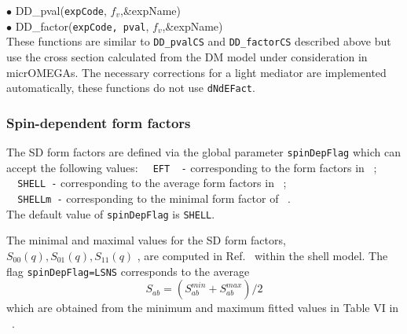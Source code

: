 \documentclass[12pt,a4paper]{article}
\begin{document}
\noindent
$\bullet$ DD\_pval(\verb|expCode|, $f_v$,\&expName)\\
$\bullet$  DD\_factor(\verb|expCode, pval|, $f_v$,\&expName)\\     
These functions are similar to  \verb|DD_pvalCS| and \verb|DD_factorCS| described above but use the  cross section calculated from the DM model under consideration in 
micrOMEGAs.  The necessary corrections for a light mediator are implemented automatically, these functions do not use {\tt dNdEFact}. \\

\subsubsection{Spin-dependent form factors}  
\label{SDmin}

The SD form factors are defined via the global parameter 
{\tt spinDepFlag}  which can accept the following values:
  \verb|  EFT  -|  corresponding to  the form factors in ~\cite{Fitzpatrick:2012ix}; \\
  \verb|  SHELL -|  corresponding to  the average form factors in ~\cite{Klos:2013rwa};\\
  \verb|  SHELLm -|  corresponding to the  minimal form factor of  ~\cite{Klos:2013rwa}.\\
The default value of {\tt spinDepFlag} is   {\tt SHELL}.


The  minimal and maximal values for the SD form factors, $S_{00}(q),S_{01}(q),S_{11}(q)$ , are computed in  Ref.~\cite{Klos:2013rwa} within the shell model.
The flag  {\tt spinDepFlag=LSNS} corresponds to the average 
\begin{equation}
\label{eq:middle}
   S_{ab}=(S_{ab}^{min} +S_{ab}^{max})/2
\end{equation}
which are obtained from  the minimum and maximum fitted values  in Table VI in ~\cite{Klos:2013rwa}. 
\end{document}
